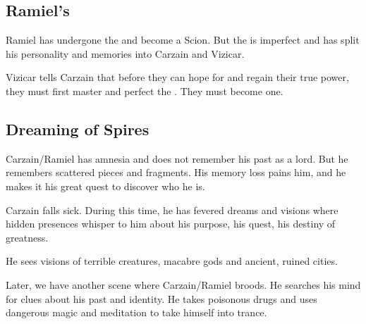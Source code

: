 








\subsection{Ramiel's \Kenosis}
Ramiel has undergone the  and become a Scion. 
But the \Kenosis{} is imperfect and has split his personality and memories into Carzain and Vizicar. 

Vizicar tells Carzain that before they can hope for  and regain their true power, they must first master and perfect the \Kenosis. 
They must become one. 









\subsection{Dreaming of \Cuezcan{} Spires}
Carzain/Ramiel has amnesia and does not remember his past as a \resphan{} lord. But he remembers scattered pieces and fragments. His memory loss pains him, and he makes it his great quest to discover who he is. 

Carzain falls sick. During this time, he has fevered dreams and visions where hidden presences whisper to him about his purpose, his quest, his destiny of greatness. 

He sees visions of terrible creatures, macabre gods and ancient, ruined cities. 

Later, we have another scene where Carzain/Ramiel broods. He searches his mind for clues about his past and identity. He takes poisonous drugs and uses dangerous magic and meditation to take himself into trance.

